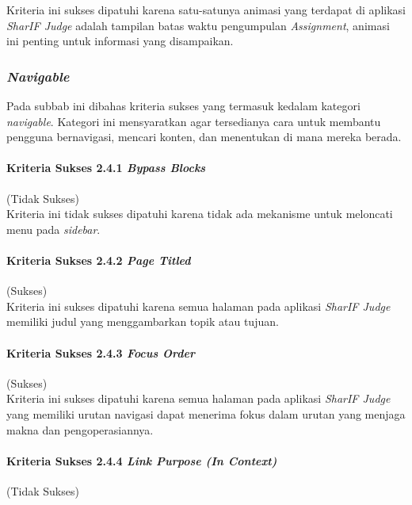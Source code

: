 Kriteria ini sukses dipatuhi karena satu-satunya animasi yang terdapat di aplikasi \textit{SharIF Judge} adalah tampilan batas waktu pengumpulan \textit{Assignment}, animasi ini penting untuk informasi yang disampaikan.

\subsubsection{\textit{Navigable}}
\label{subsubsec:navigable}

Pada subbab ini dibahas kriteria sukses yang termasuk kedalam kategori \textit{navigable}. Kategori ini mensyaratkan agar tersedianya cara untuk membantu pengguna bernavigasi, mencari konten, dan menentukan di mana mereka berada.

\paragraph{Kriteria Sukses 2.4.1 \textit{Bypass Blocks}}
\label{subsubsec:kepatuhan_kriteria_2.4.1}
(Tidak Sukses) \\

Kriteria ini tidak sukses dipatuhi karena tidak ada mekanisme untuk meloncati menu pada \textit{sidebar}.

\paragraph{Kriteria Sukses 2.4.2 \textit{Page Titled}}
\label{subsubsec:kepatuhan_kriteria_2.4.2}
(Sukses) \\

Kriteria ini sukses dipatuhi karena semua halaman pada aplikasi \textit{SharIF Judge} memiliki judul yang menggambarkan topik atau tujuan.

\paragraph{Kriteria Sukses 2.4.3 \textit{Focus Order}}
\label{subsubsec:kepatuhan_kriteria_2.4.3}
(Sukses) \\

Kriteria ini sukses dipatuhi karena semua halaman pada aplikasi \textit{SharIF Judge} yang memiliki urutan navigasi dapat menerima fokus dalam urutan yang menjaga makna dan pengoperasiannya.

\paragraph{Kriteria Sukses 2.4.4 \textit{Link Purpose (In Context)}}
\label{subsubsec:kepatuhan_kriteria_2.4.4}
(Tidak Sukses) \\


